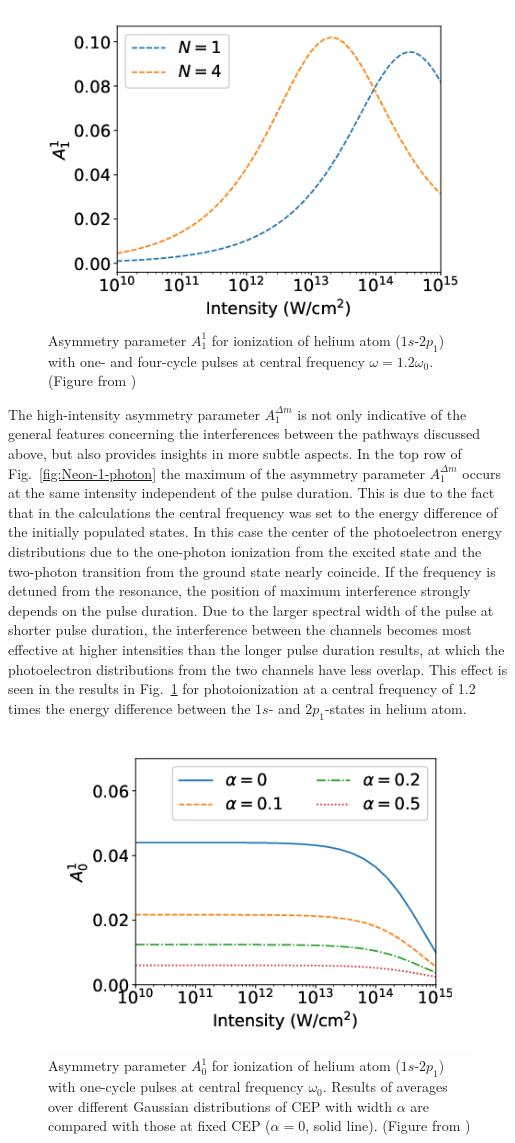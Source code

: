 \begin{figure}[!ht]
\centering
\includegraphics[width=.45\linewidth]{figs/Photo_ionization/GAP/He_2p1_detune_1p2.png}
\caption{ 
Asymmetry parameter $A_1^1$ for ionization of helium atom ($1s$-$2p_1$) with one- and four-cycle pulses at central frequency 
$\omega=1.2\omega_0$. (Figure from \cite{venzke2020_GAP})
} 
  \label{fig:detuned_GAP}
\end{figure}

The high-intensity asymmetry parameter $A_1^{\Delta m}$ is not only indicative of the general features concerning the interferences between the pathways discussed above, but also provides insights in more subtle aspects. In the top row of Fig.~\ref{fig:Neon-1-photon} the maximum of the asymmetry parameter $A_1^{\Delta m}$ occurs at the same intensity independent of the pulse duration. This is due to the fact that in the calculations the central frequency was set to the energy difference of the initially populated states. In this case the center of the photoelectron energy distributions due to the one-photon ionization from the excited state and the two-photon transition from the ground state nearly coincide. If the frequency is detuned from the resonance, the position of maximum interference strongly depends on the pulse duration. Due to the larger spectral width of the pulse at shorter pulse duration, the interference between the channels becomes most effective at higher intensities than the longer pulse duration results, at which the photoelectron distributions from the two channels have less overlap. This effect is seen in the results in Fig.\ \ref{fig:detuned_GAP} for photoionization at a central frequency of 1.2 times the energy difference between the $1s$- and $2p_1$-states in helium atom. 

\begin{figure}[!ht]
\centering
\includegraphics[width=.45\linewidth]{figs/Photo_ionization/GAP/He_2p1_asym_alpha.png}
\caption{
Asymmetry parameter $A_0^1$ for ionization of helium atom ($1s$-$2p_1$) with one-cycle pulses at central frequency $\omega_0$. Results of averages over different Gaussian distributions of CEP with width $\alpha$ are compared with those at fixed CEP ($\alpha =0$, solid line). (Figure from \cite{venzke2020_GAP})
} 
  \label{fig:cep_avg}
\end{figure}

